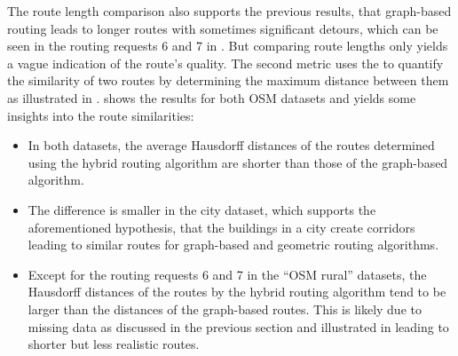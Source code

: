 			The route length comparison also supports the previous results, that graph-based routing leads to longer routes with sometimes significant detours, which can be seen in the routing requests 6 and 7 in .
			But comparing route lengths only yields a vague indication of the route's quality.
			The second metric uses the  to quantify the similarity of two routes by determining the maximum distance between them as illustrated in .
			 shows the results for both OSM datasets and yields some insights into the route similarities:
			\begin{itemize}
				\item In both datasets, the average Hausdorff distances of the routes determined using the hybrid routing algorithm are shorter than those of the graph-based algorithm.
				\item The difference is smaller in the city dataset, which supports the aforementioned hypothesis, that the buildings in a city create corridors leading to similar routes for graph-based and geometric routing algorithms.
				\item Except for the routing requests 6 and 7 in the \enquote{OSM rural} datasets, the Hausdorff distances of the routes by the hybrid routing algorithm tend to be larger than the distances of the graph-based routes.
				This is likely due to missing data as discussed in the previous section and illustrated in  leading to shorter but less realistic routes.
			\end{itemize}
			
